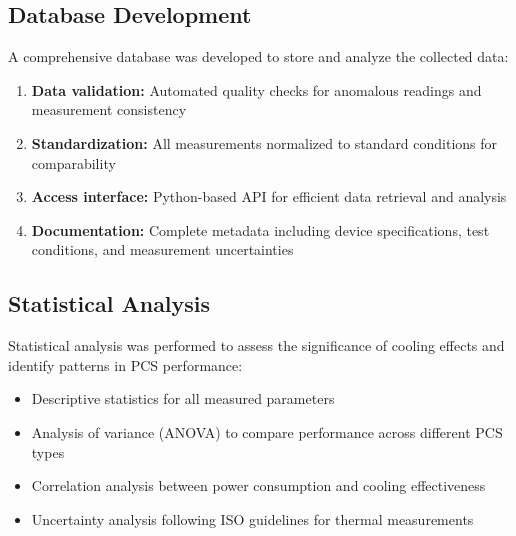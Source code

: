\subsection{Database Development}
A comprehensive database was developed to store and analyze the collected data:

\begin{enumerate}
    \item \textbf{Data validation:} Automated quality checks for anomalous readings and measurement consistency
    \item \textbf{Standardization:} All measurements normalized to standard conditions for comparability
    \item \textbf{Access interface:} Python-based API for efficient data retrieval and analysis
    \item \textbf{Documentation:} Complete metadata including device specifications, test conditions, and measurement uncertainties
\end{enumerate}

\subsection{Statistical Analysis}
Statistical analysis was performed to assess the significance of cooling effects and identify patterns in PCS performance:

\begin{itemize}
    \item Descriptive statistics for all measured parameters
    \item Analysis of variance (ANOVA) to compare performance across different PCS types
    \item Correlation analysis between power consumption and cooling effectiveness
    \item Uncertainty analysis following ISO guidelines for thermal measurements
\end{itemize}